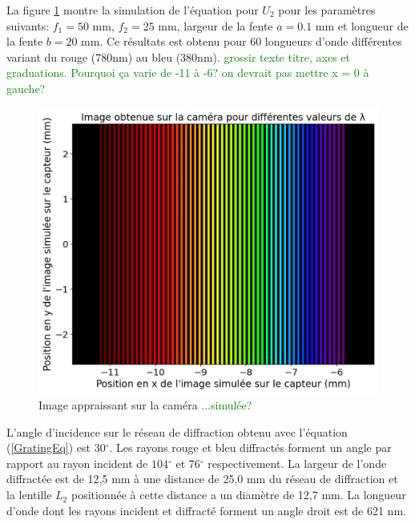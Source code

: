 \documentclass[conference]{IEEEtran}
\begin{document}
 La figure \ref{arc-en-ciel} montre la simulation de l'équation pour $U_2$ pour les paramètres suivants: 
 $f_1=50$ mm, $f_2=25$ mm, largeur de la fente $a=0.1$ mm et longueur de la fente $b=20$ mm. Ce résultats est obtenu pour
 60 longueurs d'onde différentes variant du rouge (780nm) au bleu (380nm). \textcolor{green}{grossir texte titre, axes et graduations. Pourquoi ça varie de -11 à -6? on devrait pas mettre x = 0 à gauche?}
 \begin{figure}[H]
    \centering
    \includegraphics[scale=0.4]{simu2.png}
    \caption{Image appraissant sur la caméra \textcolor{green}{...simulée?}}
    \label{arc-en-ciel}
\end{figure}

L'angle d'incidence sur le réseau de diffraction obtenu avec l'équation (\ref{GratingEq})
est $30{^\circ}$. Les rayons rouge et bleu diffractés forment un angle par rapport
au rayon incident de $104{^\circ}$ et $76{^\circ}$ respectivement. La largeur de l'onde
diffractée est de 12,5 mm à une distance de 25,0 mm du réseau de diffraction et la lentille $L_2$
positionnée à cette distance a un diamètre de 12,7 mm. 
La longueur d'onde dont les rayons incident et diffracté forment un angle droit est de 621 nm.
\end{document}
